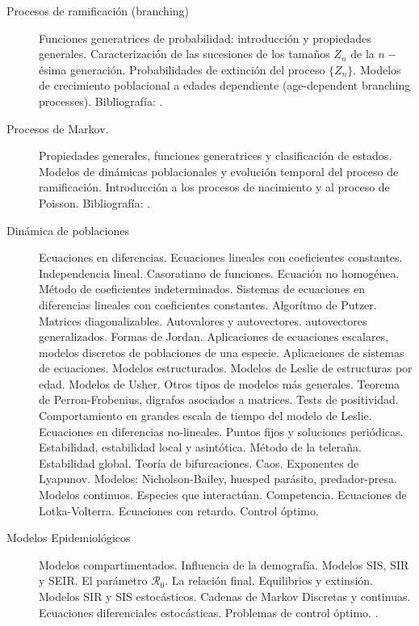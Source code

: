 \documentclass[12pt]{article}
\begin{document}
\begin{enumerate}
\begin{description}
\item[Procesos de ramificación (branching)] Funciones generatrices de probabilidad: introducción y propiedades generales. Caracterización de las sucesiones de los tamaños $Z_n$ de la $n-$ésima generación. Probabilidades de extinción   del proceso $\{Z_n \}$. Modelos de crecimiento poblacional a edades dependiente (age-dependent branching processes).    Bibliografía:  \cite{grimmet2004, SandipBanerjee729,durrett2010probability,LindaJ.S.Allen616}. 

\item[Procesos de Markov.] Propiedades generales, funciones generatrices y clasificación de estados. Modelos de dinámicas poblacionales y evolución temporal del proceso de ramificación. Introducción a los procesos de nacimiento y al proceso de Poisson.   Bibliografía:  \cite{grimmet2004, SandipBanerjee729,durrett2010probability,LindaJ.S.Allen616}.


\item[Dinámica de poblaciones] Ecuaciones en diferencias. Ecuaciones lineales con coeficientes constantes. Independencia lineal. Casoratiano de funciones. Ecuación no homogénea. Método de coeficientes indeterminados. Sistemas de ecuaciones en diferencias lineales con coeficientes constantes. Algorítmo de Putzer. Matrices diagonalizables. Autovalores y autovectores. autovectores generalizados. Formas de Jordan.  Aplicaciones de ecuaciones escalares, modelos discretos de poblaciones de una
especie. Aplicaciones de sistemas de ecuaciones. Modelos estructurados. Modelos de
Leslie de estructuras por edad. Modelos de Usher. Otros tipos de modelos más generales. Teorema de Perron-Frobenius, digrafos asociados a matrices. Tests de positividad. Comportamiento en grandes escala de tiempo del modelo de Leslie. 
 Ecuaciones en diferencias no-lineales. Puntos fijos y soluciones periódicas. Estabilidad, estabilidad local y asintótica. Método de la teleraña. Estabilidad global. Teoría de bifurcaciones. Caos. Exponentes de Lyapunov. Modelos: Nicholson-Bailey, huesped parásito, predador-presa. Modelos continuos. Especies que interactúan. Competencia. Ecuaciones de Lotka-Volterra. Ecuaciones con retardo. Control óptimo. \cite{LindaJ.S.Allen747,SaberN.Elaydi423,RichardHaberman712,ElizabethS.Allman375, MartinBraun727,RichardHaberman712,YangKuang742,JamesD.Murray744,anita2011introduction}

\item[Modelos Epidemiológicos]  Modelos compartimentados. Influencia de la demografía. Modelos SIS, SIR y SEIR. El parámetro $\mathscr{R}_0$. La relación final. Equilibrios y extinsión. Modelos SIR y SIS estocásticos. Cadenas de Markov Discretas y continuas. Ecuaciones diferenciales estocásticas. Problemas de control óptimo. \cite{FredBrauer479,MaiaMartcheva480,FredBrauer,AllenSto,BerndBlasius746,OdoDiekmann614,JamesD.Murray745,JamesD.Murray744,anita2011introduction}.



\end{description}
\end{enumerate}
\end{document}

